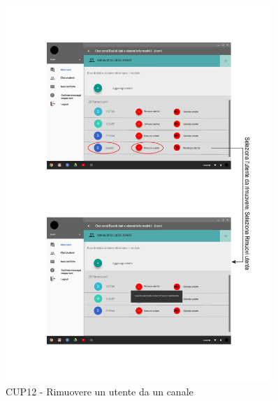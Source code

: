 \begin{figure}
	\centering
	\includegraphics[width=0.9\textwidth]{imgs/gruppo6/activities/act_cup12_cancella_utente_canale.pdf}
	\caption{CUP12 - Rimuovere un utente da un canale}
	\label{fig:act-cup12}
\end{figure}

